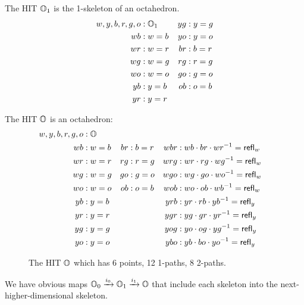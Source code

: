 \begin{mydef}
The HIT \( \mathbb{O}_1 \) is the 1-skeleton of an octahedron.
\begin{align*}
w, y, b, r, g, o &: \mathbb{O}_1 & yg &: y=g \\
wb &: w=b & yo &: y=o \\
wr &: w=r & br &: b=r \\
wg &: w=g & rg &: r=g \\
wo &: w=o & go &: g=o \\
yb &: y=b & ob &: o=b \\
yr &: y=r
\end{align*}
\end{mydef}

\begin{mydef}
The HIT \( \mathbb{O} \) is an octahedron:
\begin{align*}
w, y, b, r, g, o &: \mathbb{O} \\
wb &: w=b & br &: b=r & wbr &: wb\cdot br\cdot wr^{-1} = \mathsf{refl}_w \\
wr &: w=r & rg &: r=g & wrg &: wr\cdot rg\cdot wg^{-1} = \mathsf{refl}_w \\
wg &: w=g & go &: g=o & wgo &: wg\cdot go\cdot wo^{-1} = \mathsf{refl}_w \\
wo &: w=o & ob &: o=b & wob &: wo\cdot ob\cdot wb^{-1} = \mathsf{refl}_w \\
yb &: y=b & & & yrb &: yr\cdot rb\cdot yb^{-1} = \mathsf{refl}_y \\
yr &: y=r & & & ygr &: yg\cdot gr\cdot yr^{-1} = \mathsf{refl}_y \\
yg &: y=g & & & yog &: yo\cdot og\cdot yg^{-1} = \mathsf{refl}_y \\
yo &: y=o & & & ybo &: yb\cdot bo\cdot yo^{-1} = \mathsf{refl}_y 
\end{align*}
\end{mydef}

\begin{figure}[htbp]
\centering

\caption{The HIT \( \mathbb{O} \) which has 6 points, 12 1-paths, 8 2-paths.}
\end{figure}

We have obvious maps \( \mathbb{O}_0\xrightarrow[]{i_0} \mathbb{O}_1\xrightarrow[]{i_1} \mathbb{O} \) that include each skeleton into the next-higher-dimensional skeleton.
